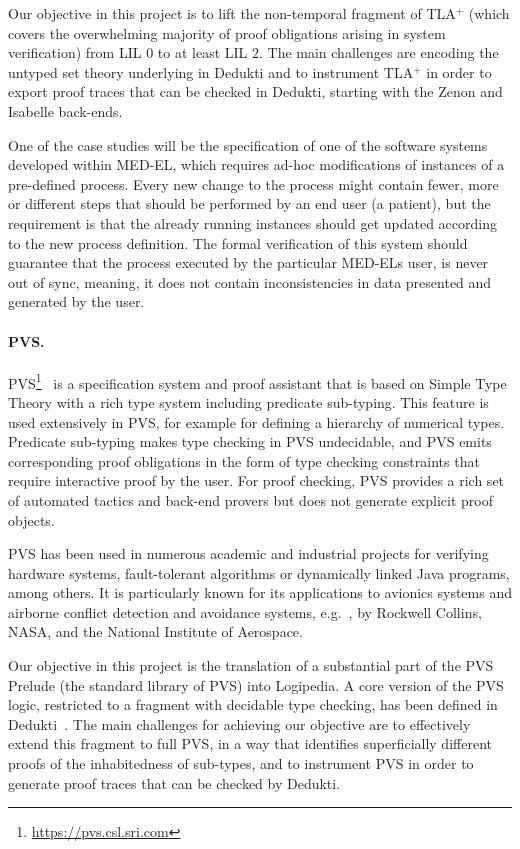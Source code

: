 Our objective in this project is to lift the non-temporal fragment of
TLA$^+$ (which covers the overwhelming majority of proof obligations
arising in system verification) from LIL $0$ to at least LIL $2$. The main
challenges are encoding the untyped set theory underlying \tlaplus in
Dedukti and to instrument TLA$^+$ in order
to export proof traces that can be checked in Dedukti, starting with
the Zenon and Isabelle back-ends.

One of the case studies will be the specification of one of the software
systems developed within MED-EL, which requires ad-hoc modifications of
instances of a pre-defined process. Every new change to the process might
contain fewer, more or different steps that should be performed by an end user
(a patient), but the requirement is that the already running instances
should get updated according to the new process definition. The formal
verification of this system should guarantee that the process executed by the
particular MED-ELs user, is never out of sync, meaning, it does not contain
inconsistencies in data presented and generated by the user.

\paragraph*{PVS.}
PVS\footnote{\url{https://pvs.csl.sri.com}}~\cite{owre:pvs} is a specification
system and proof assistant that is based on Simple Type Theory with a rich type
system including predicate sub-typing. This feature is used extensively in PVS,
for example for defining a hierarchy of numerical types. Predicate sub-typing
makes type checking in PVS undecidable, and PVS emits corresponding proof
obligations in the form of type checking constraints that require
interactive proof by the user. For proof checking, PVS provides a rich set of
automated tactics and back-end provers but does not generate explicit proof
objects.

PVS has been used in numerous academic and industrial projects for
verifying hardware systems, fault-tolerant algorithms or dynamically
linked Java programs, among others. It is particularly known for its
applications to avionics systems and airborne conflict detection and
avoidance systems, e.g.\ \cite{munoz:unmanned}, by Rockwell Collins,
NASA, and the National Institute of Aerospace.

Our objective in this project is the translation of a substantial part of the
PVS Prelude (the standard library of PVS) into Logipedia. A core version of the PVS logic,
restricted to a fragment with decidable type checking, has been defined in
Dedukti~\cite{gilbert:extending}. The main
challenges for achieving our objective are to effectively extend this fragment
to full PVS, in a way that identifies superficially different proofs of the
inhabitedness of sub-types, and to instrument PVS in order to generate proof
traces that can be checked by Dedukti.

